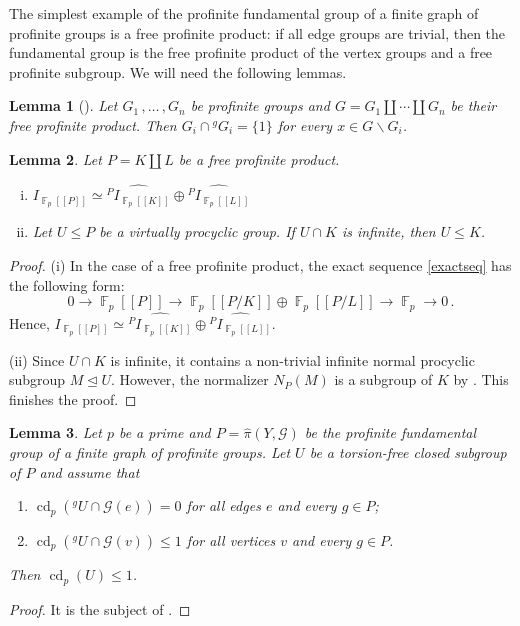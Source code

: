 \documentclass[a4paper]{amsart}
\newtheorem{lem}{Lemma}[section]
\theoremstyle{definition}
\theoremstyle{remark}
\DeclareMathOperator{\bbf}{\mathbb{F}}
\DeclareMathOperator{\cd}{\mathrm{cd}}
\newcommand{\FFalgebra}[1]{\bbf_p[\![#1]\!]}
\newcommand{\G}{\mathcal G}
\newcommand{\hpi}{\widehat{\pi}}
\begin{document}
The simplest example of the profinite fundamental group of a finite graph of profinite groups is a free profinite product: if all edge groups are trivial, then the fundamental group is the free profinite product of the vertex groups and a free profinite subgroup. We will need the following lemmas.

\begin{lem}[{\cite[Prop. 9.1.12]{RibesZalesskii2010}}]\label{normalizers} Let \(G_1\,,\ldots\,, G_n\) be profinite groups and \(G = G_1 \amalg \cdots \amalg G_n\) be their free profinite product. Then \(G_i \cap {^g G_i} =  \{1\}\) for every \(x \in G \smallsetminus G_i\).
\end{lem}

\begin{lem}\label{elliptic} Let \(P = K \amalg L\) be a free profinite product.
\begin{enumerate}[(i)]
    \item \(I_{\FFalgebra{P}} \simeq \widehat{^{P}I_{\FFalgebra{K}}} \oplus \widehat{^{P}I_{\FFalgebra{L}}}\)
    \item Let \(U \leq P\) be a virtually procyclic group. If \(U \cap K\) is infinite, then \(U \leq K\).
\end{enumerate}
\end{lem}

\begin{proof} (i) In the case of a free profinite product, the exact sequence \eqref{exactseq} has the following form: \[0 \to \FFalgebra{P} \to \FFalgebra{P/ K} \oplus \FFalgebra{P / L} \to \bbf_p \to 0\,.\] Hence, \(I_{\FFalgebra{P}} \simeq \widehat{^{P}I_{\FFalgebra{K}}} \oplus \widehat{^{P}I_{\FFalgebra{L}}}\).

(ii) Since \(U \cap K\) is infinite, it contains a non-trivial infinite normal procyclic subgroup \(M \unlhd U\). However, the normalizer \(N_P(M)\) is a subgroup of \(K\) by \cite[Cor. 7.1.5(a)]{ribesProfiniteGraphsGroups2017}. This finishes the proof.
\end{proof}

\begin{lem}\label{projectiveintersection} Let \(p\) be a prime and \(P = \hpi(Y,\G)\) be the profinite fundamental group of a finite graph of profinite groups. Let \(U\) be a torsion-free closed subgroup of \(P\) and assume that
\begin{enumerate}
    \item \(\cd_p({^g U} \cap \G(e)) = 0\) for all edges \(e\) and every \(g \in P\);
    \item \(\cd_p({^g U} \cap \G(v)) \leq 1\) for all vertices \(v\) and every \(g \in P\).
\end{enumerate}
Then \(\cd_p(U) \leq 1\).
\end{lem}
\begin{proof} It is the subject of \cite[Cor. 9.3.2]{ribesProfiniteGraphsGroups2017}.
\end{proof}
\end{document}
